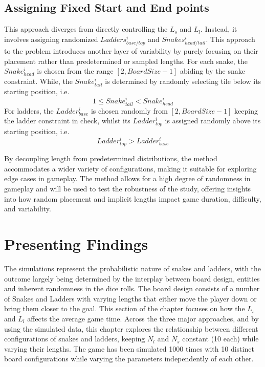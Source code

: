 \documentclass[12pt]{report}
\begin{document}
	\subsection{Assigning Fixed Start and End points}
	This approach diverges from directly controlling the $L_s$ and $L_l$. Instead, it involves assigning randomized $Ladders^i_{base/top}$ and $Snakes^i_{head/tail}$. This approach to the problem introduces another layer of variability by purely focusing on their placement rather than predetermined or sampled lengths.
	For each snake, the $Snake^i_{head}$ is chosen from the range $[2, BoardSize - 1]$ abiding by the snake constraint. While, the $Snake^i_{tail}$ is determined by randomly selecting tile below its starting position, i.e. $$1\leq Snake^i_{tail} < Snake^i_{head}$$ 
	For ladders, the $Ladder^i_{base}$ is chosen randomly from $[2, BoardSize - 1]$ keeping the ladder constraint in check, whilst its $Ladder^i_{top}$ is assigned randomly above its starting position, i.e. $$Ladder^i_{top}>Ladder^i_{base}$$ 
	
	By decoupling length from predetermined distributions, the method accommodates a wider variety of configurations, making it suitable for exploring edge cases in gameplay. The method allows for a high degree of randomness in gameplay and will be used to test the robustness of the study, offering insights into how random placement and implicit lengths impact game duration, difficulty, and variability.
	
	\section{Presenting Findings}
	The simulations represent the probabilistic nature of snakes and ladders, with the outcome largely being determined by the interplay between board design, entities and inherent randomness in the dice rolls. The board design consists of a number of Snakes and Ladders with varying lengths that either move the player down or bring them closer to the goal.  This section of the chapter focuses on how the $L_{s}$ and $L_{l}$ affects the average game time. Across the three major approaches, and by using the simulated data, this chapter explores the relationship between different configurations of snakes and ladders, keeping $N_l$ and $N_s$ constant (10 each) while varying their lengths. The game has been simulated 1000 times with 10 distinct board configurations while varying the parameters independently of each other.
\end{document}
